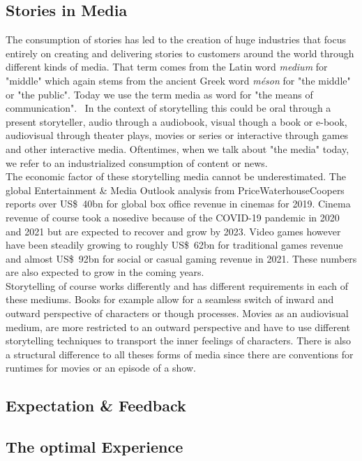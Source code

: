 \subsection{Stories in Media}
The consumption of stories has led to the creation of huge industries that focus entirely on creating and delivering stories to customers around the world through different kinds of media. That term comes from the Latin word \textit{medium} for "middle" which again stems from the ancient Greek word \textit{méson} for "the middle" or "the public". Today we use the term media as word for "the means of communication".~\cite{Hoffmann2000} In the context of storytelling this could be oral through a present storyteller, audio through a audiobook, visual though a book or e-book, audiovisual through theater plays, movies or series or interactive through games and other interactive media. Oftentimes, when we talk about "the media" today, we refer to an industrialized consumption of content or news.\\
The economic factor of these storytelling media cannot be underestimated. The global Entertainment \& Media Outlook analysis from PriceWaterhouseCoopers reports over US\$~40bn for global box office revenue in cinemas for 2019. Cinema revenue of course took a nosedive because of the COVID-19 pandemic in 2020 and 2021 but are expected to recover and grow by 2023. Video games however have been steadily growing to roughly US\$~62bn for traditional games revenue and almost US\$~92bn for social or casual gaming revenue in 2021. These numbers are also expected to grow in the coming years.~\cite{PwC2021}\\
Storytelling of course works differently and has different requirements in each of these mediums. Books for example allow for a seamless switch of inward and outward perspective of characters or though processes. Movies as an audiovisual medium, are more restricted to an outward perspective and have to use different storytelling techniques to transport the inner feelings of characters. There is also a structural difference to all theses forms of media since there are conventions for runtimes for movies or an episode of a show.~\cite{Ryan2004}\\

\subsection{Expectation \& Feedback}

\subsection{The optimal Experience}


